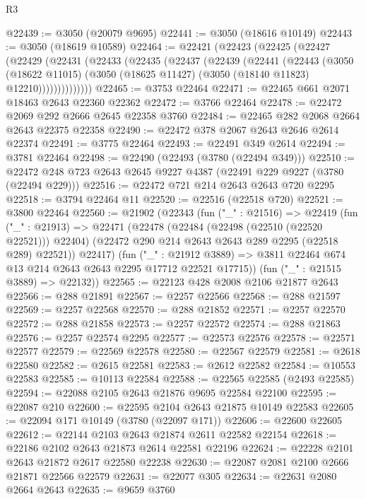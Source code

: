 \begin{lexlean}{R3}
\begin{coremodule}
@22439 := @3050 (@20079 @9695)
@22441 := @3050 (@18616 @10149)
@22443 := @3050 (@18619 @10589)
@22464 := @22421
    (@22423
      (@22425
        (@22427
          (@22429
            (@22431
              (@22433
                (@22435
                  (@22437
                    (@22439
                      (@22441
                        (@22443
                          (@3050
                            (@18622 @11015)
                            (@3050 (@18625 @11427) (@3050 (@18140 @11823) @12210))))))))))))))
@22465 := @3753 @22464
@22471 := @22465 @661 @2071 @18463 @2643 @22360 @22362
@22472 := @3766 @22464
@22478 := @22472 @2069 @292 @2666 @2645 @22358 @3760
@22484 := @22465 @282 @2068 @2664 @2643 @22375 @22358
@22490 := @22472 @378 @2067 @2643 @2646 @2614 @22374
@22491 := @3775 @22464
@22493 := @22491 @349 @2614
@22494 := @3781 @22464
@22498 := @22490 (@22493 (@3780 (@22494 @349)))
@22510 := @22472 @248 @723 @2643 @2645 @9227 @4387 (@22491 @229 @9227 (@3780 (@22494 @229)))
@22516 := @22472 @721 @214 @2643 @2643 @720 @2295
@22518 := @3794 @22464 @11
@22520 := @22516 (@22518 @720)
@22521 := @3800 @22464
@22560 := @21902
    (@22343
      (fun ("_" : @21516) =>
      @22419
        (fun ("_" : @21913) =>
        @22471
          (@22478
            (@22484 (@22498 (@22510 (@22520 @22521))) @22404)
            (@22472 @290 @214 @2643 @2643 @289 @2295 (@22518 @289) @22521))
          @22417)
        (fun ("_" : @21912 @3889) =>
        @3811 @22464 @674 @13 @214 @2643 @2643 @2295 @17712 @22521 @17715))
      (fun ("_" : @21515 @3889) => @22132))
@22565 := @22123 @428 @2008 @2106 @21877 @2643
@22566 := @288 @21891
@22567 := @2257 @22566
@22568 := @288 @21597
@22569 := @2257 @22568
@22570 := @288 @21852
@22571 := @2257 @22570
@22572 := @288 @21858
@22573 := @2257 @22572
@22574 := @288 @21863
@22576 := @2257 @22574 @2295
@22577 := @22573 @22576
@22578 := @22571 @22577
@22579 := @22569 @22578
@22580 := @22567 @22579
@22581 := @2618 @22580
@22582 := @2615 @22581
@22583 := @2612 @22582
@22584 := @10553 @22583
@22585 := @10113 @22584
@22588 := @22565 @22585 (@2493 @22585)
@22594 := @22088 @2105 @2643 @21876 @9695 @22584 @22100
@22595 := @22087 @210
@22600 := @22595 @2104 @2643 @21875 @10149 @22583
@22605 := @22094 @171 @10149 (@3780 (@22097 @171))
@22606 := @22600 @22605
@22612 := @22144 @2103 @2643 @21874 @2611 @22582 @22154
@22618 := @22186 @2102 @2643 @21873 @2614 @22581 @22196
@22624 := @22228 @2101 @2643 @21872 @2617 @22580 @22238
@22630 := @22087 @2081 @2100 @2666 @21871 @22566 @22579
@22631 := @22077 @305
@22634 := @22631 @2080 @2664 @2643
@22635 := @9659 @3760

\end{coremodule}
\end{lexlean}
